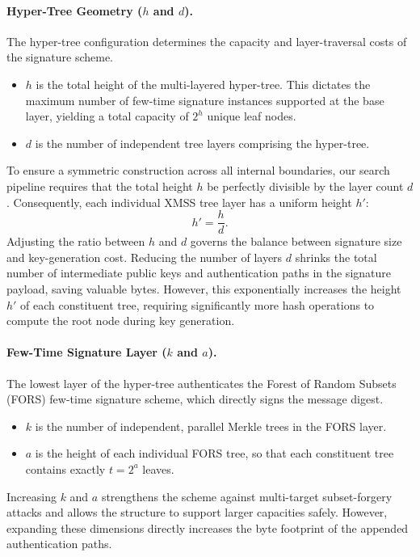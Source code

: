 \paragraph{Hyper-Tree Geometry ($h$ and $d$).}
The hyper-tree configuration determines the capacity and layer-traversal costs of the signature scheme.
\begin{itemize}
    \item $h$ is the total height of the multi-layered hyper-tree. This dictates the maximum number of few-time signature instances supported at the base layer, yielding a total capacity of $2^h$ unique leaf nodes.
    \item $d$ is the number of independent tree layers comprising the hyper-tree.
\end{itemize}
To ensure a symmetric construction across all internal boundaries, our search pipeline requires that the total height $h$ be perfectly divisible by the layer count $d$. Consequently, each individual XMSS tree layer has a uniform height $h'$:
\begin{equation*}
    h' = \frac{h}{d}.
\end{equation*}
Adjusting the ratio between $h$ and $d$ governs the balance between signature size and key-generation cost. Reducing the number of layers $d$ shrinks the total number of intermediate public keys and authentication paths in the signature payload, saving valuable bytes. However, this exponentially increases the height $h'$ of each constituent tree, requiring significantly more hash operations to compute the root node during key generation.

\paragraph{Few-Time Signature Layer ($k$ and $a$).}
The lowest layer of the hyper-tree authenticates the Forest of Random Subsets (FORS) few-time signature scheme, which directly signs the message digest.
\begin{itemize}
    \item $k$ is the number of independent, parallel Merkle trees in the FORS layer.
    \item $a$ is the height of each individual FORS tree, so that each constituent tree contains exactly $t = 2^a$ leaves.
\end{itemize}

Increasing $k$ and $a$ strengthens the scheme against multi-target subset-forgery attacks and allows the structure to support larger capacities safely. However, expanding these dimensions directly increases the byte footprint of the appended authentication paths.

